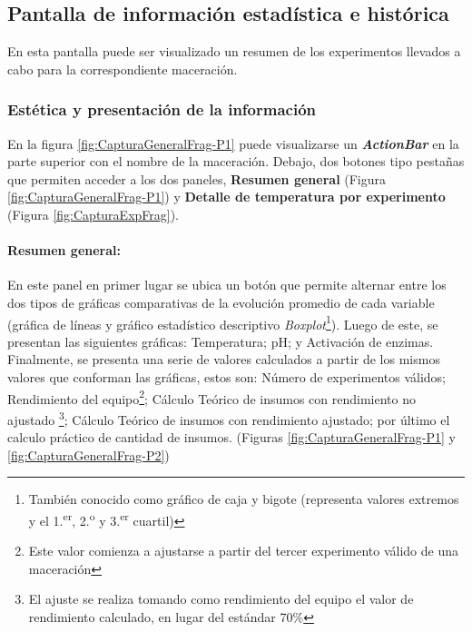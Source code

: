         \subsection{Pantalla de información estadística e histórica}
        \label{DescripPantallaEstadística}
            \par En esta pantalla puede ser visualizado un resumen de los experimentos llevados a cabo para la correspondiente maceración.
        
            \subsubsection{Estética y presentación de la información}
            \par En la figura \ref{fig:CapturaGeneralFrag-P1} puede visualizarse un \textbf{\textit{\gls{ActionBar}}} en la parte superior con el nombre de la maceración. Debajo, dos botones tipo pestañas que permiten acceder a los dos paneles, \textbf{Resumen general} (Figura \ref{fig:CapturaGeneralFrag-P1}) y \textbf{Detalle de temperatura por experimento} (Figura \ref{fig:CapturaExpFrag}). 
            
            \paragraph{Resumen general:} En este panel en primer lugar se ubica un botón que permite alternar entre los dos tipos de gráficas comparativas de la evolución promedio de cada variable (gráfica de líneas y gráfico estadístico descriptivo \textit{Boxplot}\footnote{También conocido como gráfico de caja y bigote (representa valores extremos y el 1.\textsuperscript{er}, 2.\textsuperscript{o} y 3.\textsuperscript{er} cuartil)}). Luego de este, se presentan las siguientes gráficas: Temperatura; pH; y Activación de enzimas. Finalmente, se presenta una serie de valores calculados a partir de los mismos valores que conforman las gráficas, estos son: Número de experimentos válidos; Rendimiento del equipo\footnote{Este valor comienza a ajustarse a partir del tercer experimento válido de una maceración}; Cálculo Teórico de insumos con rendimiento no ajustado \footnote{El ajuste se realiza tomando como rendimiento del equipo el valor de rendimiento calculado, en lugar del estándar 70\%}; Cálculo Teórico de insumos con rendimiento ajustado; por último el calculo práctico de cantidad de insumos. (Figuras \ref{fig:CapturaGeneralFrag-P1} y \ref{fig:CapturaGeneralFrag-P2}) 
            
